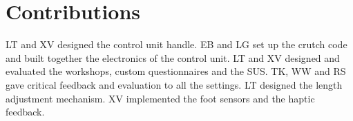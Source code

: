 \documentclass[conference,a4paper]{IEEEtran}
\begin{document}
\section{Contributions}
LT and XV designed the control unit handle. EB and LG set up the crutch code and built together the electronics of the control unit. LT and XV designed and evaluated the workshops, custom questionnaires and the SUS. TK, WW and RS gave critical feedback and evaluation to all the settings. LT designed the length adjustment mechanism. XV implemented the foot sensors and the haptic feedback.






%
%












%


\cleardoublepage
\appendix

%
%
%
%




\end{document}
